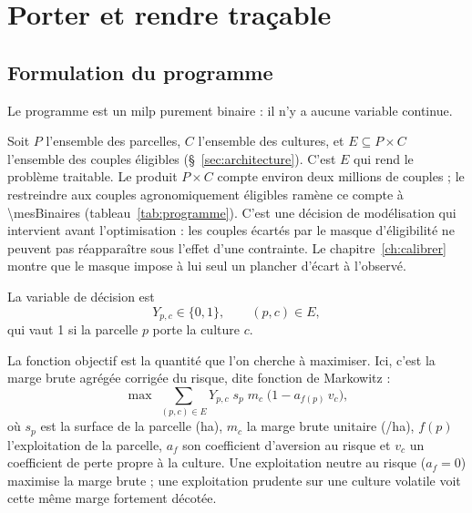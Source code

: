 \chapter{Porter et rendre traçable}
\label{ch:porter}
%


\section{Formulation du programme}
\label{sec:formulation}

Le programme est un \gls{milp} purement binaire : il n'y a aucune variable continue.

Soit $P$ l'ensemble des parcelles, $C$ l'ensemble des cultures, et $E \subseteq P \times C$
l'ensemble des couples éligibles (§~\ref{sec:architecture}). C'est $E$ qui rend le problème
traitable. Le produit $P \times C$ compte environ deux millions de couples ; le restreindre aux
couples agronomiquement éligibles ramène ce compte à \num{\mesBinaires}
(tableau~\ref{tab:programme}). C'est une décision de modélisation qui intervient avant
l'optimisation : les couples écartés par le masque d'éligibilité ne peuvent pas réapparaître
sous l'effet d'une contrainte. Le chapitre~\ref{ch:calibrer} montre que le masque impose à lui
seul un plancher d'écart à l'observé.

La variable de décision est
\[
  Y_{p,c} \in \{0,1\}, \qquad (p,c) \in E,
\]
qui vaut 1 si la parcelle $p$ porte la culture $c$.

La fonction objectif est la quantité que l'on cherche à maximiser. Ici, c'est la marge brute
agrégée corrigée du risque, dite fonction de Markowitz \parencite{markowitz1952} :
\begin{equation}
  \max \; \sum_{(p,c) \in E} Y_{p,c} \; s_p \; m_c \; \bigl(1 - a_{f(p)} \, v_c \bigr),
  \label{eq:objectif}
\end{equation}
où $s_p$ est la surface de la parcelle (ha), $m_c$ la marge brute unitaire (\eur/ha), $f(p)$
l'exploitation de la parcelle, $a_f$ son coefficient d'aversion au risque et $v_c$ un
coefficient de perte propre à la culture. Une exploitation neutre au risque ($a_f = 0$) maximise
la marge brute ; une exploitation prudente sur une culture volatile voit cette même marge
fortement décotée.

